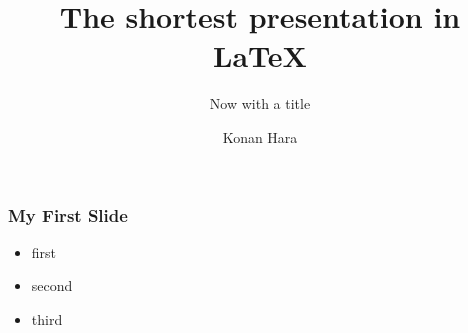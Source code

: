 \documentclass{beamer}
\title[Short Presentation]{The shortest presentation in \LaTeX}
\subtitle[title edition]{Now with a title}
\author[K, Hara]{Konan Hara}
\institute[UT]{University of Tokyo}
\begin{document}
	
	\begin{frame}[plain]
	\titlepage
	\end{frame}

	\begin{frame}
	\frametitle{My First Slide}
	\begin{itemize}
	\item first
	\item second
	\item third
	\end{itemize}
	\end{frame}
\end{document}
